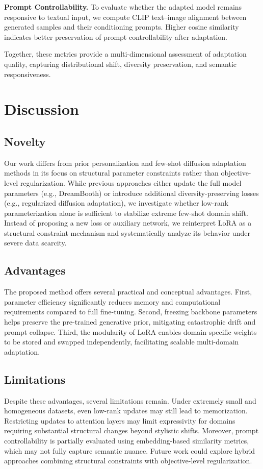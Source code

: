 \documentclass{article}
\begin{document}
\textbf{Prompt Controllability.}
To evaluate whether the adapted model remains responsive to textual input, we compute CLIP text–image alignment between generated samples and their conditioning prompts. Higher cosine similarity indicates better preservation of prompt controllability after adaptation.

Together, these metrics provide a multi-dimensional assessment of adaptation quality, capturing distributional shift, diversity preservation, and semantic responsiveness.

\section{Discussion}

\subsection{Novelty}

Our work differs from prior personalization and few-shot diffusion adaptation methods in its focus on structural parameter constraints rather than objective-level regularization. 
While previous approaches either update the full model parameters (e.g., DreamBooth) or introduce additional diversity-preserving losses (e.g., regularized diffusion adaptation), we investigate whether low-rank parameterization alone is sufficient to stabilize extreme few-shot domain shift. 
Instead of proposing a new loss or auxiliary network, we reinterpret LoRA as a structural constraint mechanism and systematically analyze its behavior under severe data scarcity.

\subsection{Advantages}

The proposed method offers several practical and conceptual advantages. 
First, parameter efficiency significantly reduces memory and computational requirements compared to full fine-tuning. 
Second, freezing backbone parameters helps preserve the pre-trained generative prior, mitigating catastrophic drift and prompt collapse. 
Third, the modularity of LoRA enables domain-specific weights to be stored and swapped independently, facilitating scalable multi-domain adaptation.

\subsection{Limitations}

Despite these advantages, several limitations remain. 
Under extremely small and homogeneous datasets, even low-rank updates may still lead to memorization. 
Restricting updates to attention layers may limit expressivity for domains requiring substantial structural changes beyond stylistic shifts. 
Moreover, prompt controllability is partially evaluated using embedding-based similarity metrics, which may not fully capture semantic nuance. 
Future work could explore hybrid approaches combining structural constraints with objective-level regularization.




\end{document}
